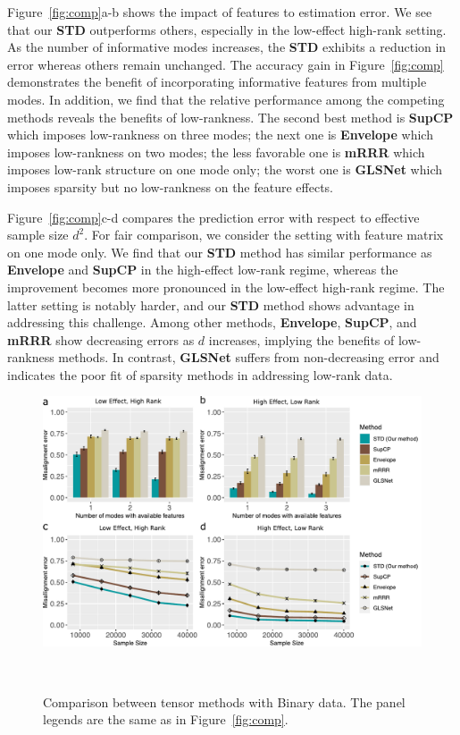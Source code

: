 \documentclass[12pt]{article}
\theoremstyle{definition}
\theoremstyle{definition}
\begin{document}
{  Figure~\ref{fig:comp}a-b shows the impact of features to estimation error. We see that our \textbf{STD} outperforms others, especially in the low-effect high-rank setting. As the number of informative modes increases, the \textbf{STD} exhibits a reduction in error whereas others remain unchanged. The accuracy gain in Figure~\ref{fig:comp} demonstrates the benefit of incorporating informative features from multiple modes. In addition, we find that the relative performance among the competing methods reveals the benefits of low-rankness. 
The second best method is \textbf{SupCP} which imposes low-rankness on three modes; the next one is \textbf{Envelope} which imposes low-rankness on two modes; the less favorable one is \textbf{mRRR} which imposes low-rank structure on one mode only; the worst one is \textbf{GLSNet} which imposes sparsity but no low-rankness on the feature effects. 

Figure~\ref{fig:comp}c-d compares the prediction error with respect to effective sample size $d^2$. For fair comparison, we consider the setting with feature matrix on one mode only. We find that our \textbf{STD} method has similar performance as \textbf{Envelope} and \textbf{SupCP} in the high-effect low-rank regime, whereas the improvement becomes more pronounced in the low-effect high-rank regime. The latter setting is notably harder, and our \textbf{STD} method shows advantage in addressing this challenge. Among other methods, \textbf{Envelope}, \textbf{SupCP}, and \textbf{mRRR} show decreasing errors as $d$ increases, implying the benefits of low-rankness methods. In contrast, \textbf{GLSNet} suffers from non-decreasing error and indicates the poor fit of sparsity methods in addressing low-rank data. 

\begin{figure}[t]
\centering
\includegraphics[width=12cm]{comp_final_binary.pdf} 
\caption{Comparison between tensor methods with Binary data. The panel legends are the same as in Figure~\ref{fig:comp}.}~\label{fig:comp_b}
\vspace{-.5cm}
\end{figure}

}
\end{document}
